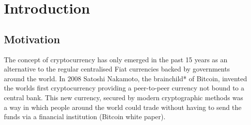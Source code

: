 \documentclass{l4proj}
\begin{document}
%
%
%
%
%
%
%
%
\chapter{Introduction}


\section{Motivation}

The concept of cryptocurrency has only emerged in the past 15 years as an alternative to the regular
centralised Fiat currencies backed by governments around the world. In 2008 Satoshi Nakamoto, the 
brainchild* of Bitcoin, invented the worlds first cryptocurrency providing a peer-to-peer currency
not bound to a central bank. This new currency, secured by modern cryptographic methods was a way in
which people around the world could trade without having to send the funds via a financial institution (Bitcoin white paper).
\end{document}
